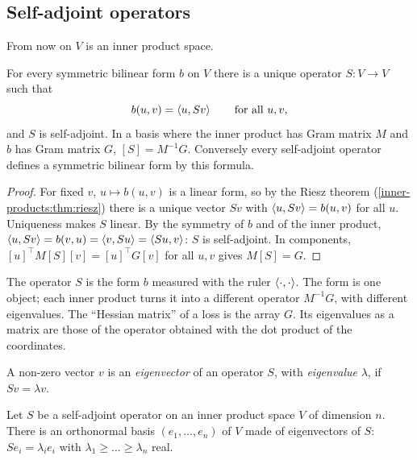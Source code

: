 \begin{notechapter}
\section{Self-adjoint operators}\label{spectral-svd:sec:spectral}

From now on $V$ is an inner product space.

\begin{proposition}
\label{spectral-svd:prop:form-operator}
For every symmetric bilinear form $b$ on $V$ there is a unique operator
$S:V\to V$ such that
\[
  b(u, v) = \left\langle u, Sv \right\rangle \qquad\text{for all } u, v ,
\]
and $S$ is self-adjoint. In a basis where the inner product has Gram
matrix $M$ and $b$ has Gram matrix $G$, $[S] = M^{-1}G$. Conversely every
self-adjoint operator defines a symmetric bilinear form by this formula.
\end{proposition}

\begin{proof}
For fixed $v$, $u\mapsto b(u, v)$ is a linear form, so by the Riesz
theorem (\cref{inner-products:thm:riesz}) there is a unique vector $Sv$
with $\left\langle u, Sv \right\rangle = b(u, v)$ for all $u$. Uniqueness makes $S$ linear.
By the symmetry of $b$ and of the inner product,
$\left\langle u, Sv \right\rangle = b(v, u) = \left\langle v, Su \right\rangle = \left\langle Su, v \right\rangle$: $S$ is
self-adjoint. In components, $[u]^\top M[S][v] = [u]^\top G[v]$ for all
$u, v$ gives $M[S] = G$.
\end{proof}

\begin{intuition}
The operator $S$ is the form $b$ measured with the ruler
$\left\langle \cdot, \cdot \right\rangle$. The form is one object; each inner product turns it
into a different operator $M^{-1}G$, with different eigenvalues. The
``Hessian matrix'' of a loss is the array $G$. Its eigenvalues as a matrix
are those of the operator obtained with the dot product of the
coordinates.
\end{intuition}

A non-zero vector $v$ is an \emph{eigenvector} of an operator $S$, with
\emph{eigenvalue} $\lambda$, if $Sv = \lambda v$.

\begin{theorem}\label{spectral-svd:thm:spectral}
Let $S$ be a self-adjoint operator on an inner product space $V$ of
dimension $n$. There is an orthonormal basis $(e_1,\dots,e_n)$ of $V$ made
of eigenvectors of $S$: $Se_i = \lambda_ie_i$ with
$\lambda_1\geq\dots\geq\lambda_n$ real.
\end{theorem}


\end{notechapter}
